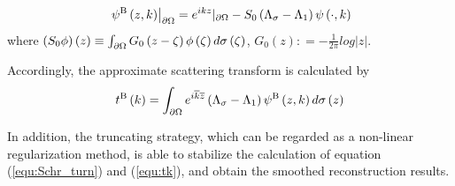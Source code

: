 \begin{equation}\label{equ:fsi_B}
{\left. {{\psi ^{\rm{B}}}\left( {z,k} \right)} \right|_{\partial \Omega }} = {e^{ikz}}{|_{\partial {\rm{\Omega }}}} - {S_0}\left( {{\Lambda _\sigma } - {\Lambda _1}} \right)\psi \left( { \cdot ,k} \right)
\end{equation}
where $\left( {{S_0}\phi } \right)\left( z \right) \equiv \int_{\partial {\rm{\Omega }}} {{G_0}\left( {z - \zeta } \right)\phi \left( \zeta  \right)d\sigma \left( \zeta  \right)} $, ${G_0}\left( z \right): =  - \frac{1}{{2\pi }}log\left| z \right|$.

Accordingly, the approximate scattering transform is calculated by
\begin{equation}\label{equ:t_B}
{t^{\rm{B}}}\left( k \right) = \int_{\partial \Omega } {{e^{i\overline k \overline z }}\left( {{\Lambda _\sigma } - {\Lambda _1}} \right){\psi ^{\rm{B}}}\left( {z,k} \right)d\sigma \left( z \right)}
\end{equation}

In addition, the truncating strategy\cite{2009Regularized}, which can be regarded as a non-linear regularization method, is able to stabilize the calculation of equation (\ref{equ:Schr_turn}) and (\ref{equ:tk}), and obtain the smoothed reconstruction results.
